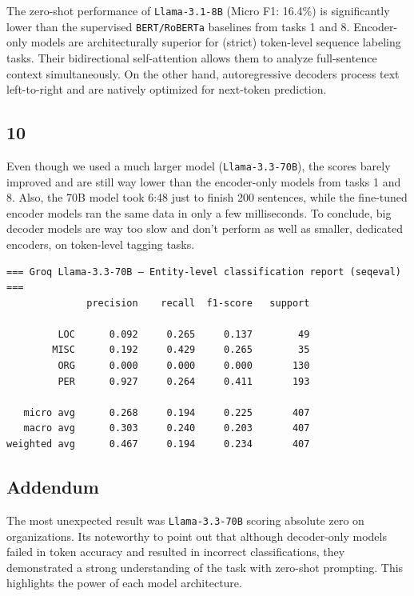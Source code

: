 \documentclass[12pt,a4paper]{report}%
\begin{document}
The zero-shot performance of \lstinline{Llama-3.1-8B} (Micro F1: 16.4\%) is significantly lower than the supervised \lstinline{BERT/RoBERTa} baselines from tasks 1 and 8. Encoder-only models are architecturally superior for (strict) token-level sequence labeling tasks. Their bidirectional self-attention allows them to analyze full-sentence context simultaneously. On the other hand, autoregressive decoders process text left-to-right and are natively optimized for next-token prediction.


\subsection*{10}

Even though we used a much larger model (\lstinline{Llama-3.3-70B}), the scores barely improved and are still way lower than the encoder-only models from tasks 1 and 8. Also, the 70B model took 6:48 just to finish 200 sentences, while the fine-tuned encoder models ran the same data in only a few milliseconds. To conclude, big decoder models are way too slow and don't perform as well as smaller, dedicated encoders, on token-level tagging tasks.

\begin{minipage}{\linewidth}
\begin{lstlisting}
=== Groq Llama-3.3-70B — Entity-level classification report (seqeval) ===
              precision    recall  f1-score   support

         LOC      0.092     0.265     0.137        49
        MISC      0.192     0.429     0.265        35
         ORG      0.000     0.000     0.000       130
         PER      0.927     0.264     0.411       193

   micro avg      0.268     0.194     0.225       407
   macro avg      0.303     0.240     0.203       407
weighted avg      0.467     0.194     0.234       407
\end{lstlisting}
\end{minipage}



\subsection*{Addendum}

The most unexpected result was \lstinline{Llama-3.3-70B} scoring absolute zero on organizations. Its noteworthy to point out that although decoder-only models failed in token accuracy and resulted in incorrect classifications, they demonstrated a strong understanding of the task with zero-shot prompting. This highlights the power of each model architecture.


\clearpage %
\nocite{*}
{} %
\begingroup %
\footnotesize %


\endgroup %
\end{document}
